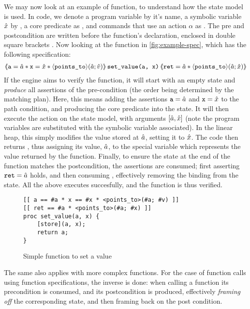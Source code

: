 We may now look at an example of function, to understand how the state model is used. In code, we denote a program variable  by it's name, a symbolic variable $\hat{x}$ by , a core predicate \corepred{\delta}{\ins}{\outs} as \code{<$\delta$>($\ins$;$\outs$)}, and commands that use an action $\alpha$ as . The pre and postcondition are written before the function's declaration, enclosed in double square brackets \code{[[...]]}. Now looking at the function  in \autoref{fig:example-spec}, which has the following specification:
\begin{align*}%
\ESLtriple%
	{\code{a}=\sym a * \code{x} = \sym x * \corepred{\pointsto}{\sym a}{\sym v}}%
	{\code{set\_value(a, x)}}%
	{\code{ret} = \sym a * \corepred{\pointsto}{\sym a}{\sym x}}
\end{align*}%
If the engine aims to verify the function, it will start with an empty state and \emph{produce} all assertions of the pre-condition (the order being determined by the matching plan). Here, this means adding the assertions $\texttt{a} = \hat{a}$ and $\texttt{x} = \hat{x}$ to the path condition, and producing the core predicate  into the state. It will then execute the action  on the state model, with arguments $[\hat{a}, \hat{x}]$ (note the program variables are substituted with the symbolic variable associated). In the linear heap, this simply modifies the value stored at $\hat{a}$, setting it to $\hat{x}$. The code then returns , thus assigning its value, $\hat{a}$, to the special variable  which represents the value returned by the function. Finally, to ensure the state at the end of the function matches the postcondition, the assertions are consumed; first asserting $\texttt{ret} = \hat{a}$ holds, and then consuming , effectively removing the binding from the state. All the above executes succesfully, and the function is thus verified.

\begin{figure}\centering
\begin{lstlisting}
[[ a == #a * x == #x * <points_to>(#a; #v) ]]
[[ ret == #a * <points_to>(#a; #x) ]]
proc set_value(a, x) {
	[store](a, x);
	return a;
}
\end{lstlisting}
\caption{Simple function to set a value}
\label{fig:example-spec}
\end{figure}

The same also applies with more complex functions. For the case of function calls using function specifications, the inverse is done: when calling a function its precondition is consumed, and its postcondition is produced, effectively \emph{framing off} the corresponding state, and then framing back on the post condition.

